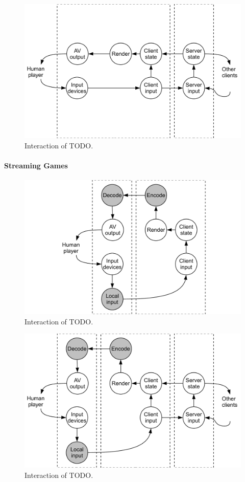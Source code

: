 \begin{figure}
  \centering
  \includegraphics[width=0.8\columnwidth]{../models/component_interaction-online.pdf}
  \caption{Interaction of TODO.}
  \label{fig:component-model-online}
\end{figure}

\paragraph*{Streaming Games}

\begin{figure}
  \centering
  \includegraphics[width=0.8\columnwidth]{../models/component_interaction-cloud.pdf}
  \caption{Interaction of TODO.}
  \label{fig:component-model-cloud}
\end{figure}

\begin{figure}
  \centering
  \includegraphics[width=0.8\columnwidth]{../models/component_interaction-online+cloud.pdf}
  \caption{Interaction of TODO.}
  \label{fig:component-model-online+cloud}
\end{figure}

